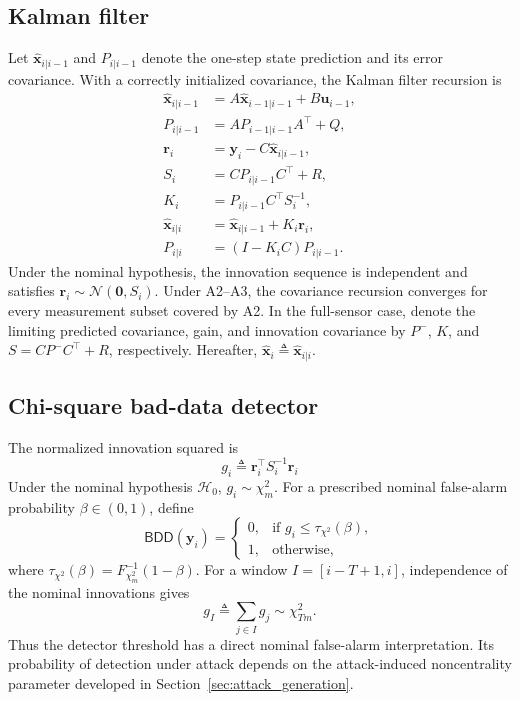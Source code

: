 \subsection{Kalman filter}
Let $\hat{\mathbf{x}}_{i|i-1}$ and $P_{i|i-1}$ denote the one-step state prediction and its error covariance. With a correctly initialized covariance, the Kalman filter recursion is
\begin{align}
\hat{\mathbf{x}}_{i|i-1} &= A\hat{\mathbf{x}}_{i-1|i-1}+B\mathbf{u}_{i-1}, \label{equ:kf_predict}\\
P_{i|i-1} &= AP_{i-1|i-1}A^{\top}+Q, \label{equ:kf_Ppred}\\
\mathbf{r}_i &= \mathbf{y}_i-C\hat{\mathbf{x}}_{i|i-1}, \label{equ:innovation}\\
S_i &= CP_{i|i-1}C^{\top}+R, \label{equ:innov_cov}\\
K_i &= P_{i|i-1}C^{\top}S_i^{-1}, \label{equ:kf_gain}\\
\hat{\mathbf{x}}_{i|i} &= \hat{\mathbf{x}}_{i|i-1}+K_i\mathbf{r}_i, \label{equ:kf_update}\\
P_{i|i} &= \left(I-K_iC\right)P_{i|i-1}. \label{equ:kf_Pupdate}
\end{align}
Under the nominal hypothesis, the innovation sequence is independent and satisfies $\mathbf{r}_i\sim\mathcal{N}(\mathbf{0},S_i)$. Under A2--A3, the covariance recursion converges for every measurement subset covered by A2. In the full-sensor case, denote the limiting predicted covariance, gain, and innovation covariance by $P^-$, $K$, and $S=CP^-C^\top+R$, respectively. Hereafter, $\hat{\mathbf{x}}_i\triangleq\hat{\mathbf{x}}_{i|i}$.

\subsection{Chi-square bad-data detector}
The normalized innovation squared is
\begin{equation}\label{equ:chisq_stat}
g_i \triangleq \mathbf{r}_i^{\top}S_i^{-1}\mathbf{r}_i
\end{equation}
Under the nominal hypothesis $\mathcal{H}_0$, $g_i\sim\chi_m^2$. For a prescribed nominal false-alarm probability $\beta\in(0,1)$, define
\begin{equation}\label{equ:chisq_detector}
\textsf{BDD}(\mathbf{y}_i)=\begin{cases}
0,&\text{if } g_i\le\tau_{\chi^2}(\beta),\\
1,&\text{otherwise,}
\end{cases}
\end{equation}
where $\tau_{\chi^2}(\beta)=F^{-1}_{\chi_m^2}(1-\beta)$. For a window $I=[i-T+1,i]$, independence of the nominal innovations gives
\begin{equation}\label{equ:window_chisq}
g_I\triangleq\sum_{j\in I}g_j\sim\chi^2_{Tm}.
\end{equation}
Thus the detector threshold has a direct nominal false-alarm interpretation. Its probability of detection under attack depends on the attack-induced noncentrality parameter developed in Section~\ref{sec:attack_generation}.

